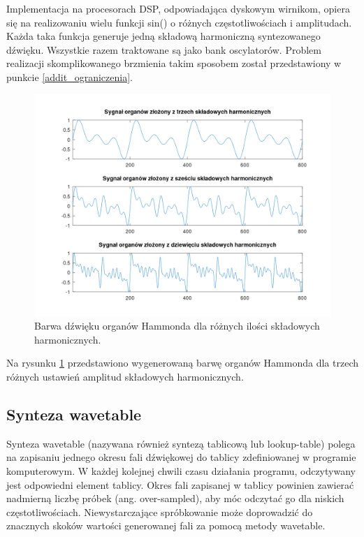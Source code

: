 Implementacja na procesorach DSP, odpowiadająca dyskowym wirnikom, opiera się na realizowaniu wielu funkcji sin() o różnych częstotliwościach i amplitudach. Każda taka funkcja generuje jedną składową harmoniczną syntezowanego dźwięku. Wszystkie razem traktowane są jako bank oscylatorów. Problem realizacji skomplikowanego brzmienia takim sposobem został przedstawiony w punkcie \ref{addit_ograniczenia}.

\begin{figure}[H]
	\centering
	\includegraphics[width=15cm]{grafiki/add_hammond_matlab}
	\captionsetup{justification=centering}
	\caption{Barwa dźwięku organów Hammonda dla różnych ilości składowych harmonicznych.}
	\label{rys:add_hammond_matlab}
\end{figure}

Na rysunku \ref{rys:add_hammond_matlab} przedstawiono wygenerowaną barwę organów Hammonda dla trzech różnych ustawień amplitud składowych harmonicznych.


\subsection{Synteza wavetable} \label{add_wavetable}
Synteza wavetable (nazywana również syntezą tablicową lub lookup-table) polega na zapisaniu jednego okresu fali dźwiękowej do tablicy zdefiniowanej w programie komputerowym. W każdej kolejnej chwili czasu działania programu, odczytywany jest odpowiedni element tablicy. Okres fali zapisanej w tablicy powinien zawierać nadmierną liczbę próbek (ang. over-sampled), aby móc odczytać go dla niskich częstotliwościach. Niewystarczające spróbkowanie może doprowadzić do znacznych skoków wartości generowanej fali za pomocą metody wavetable.

